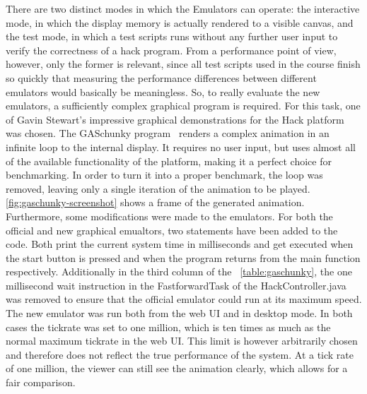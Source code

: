 There are two distinct modes in which the Emulators can operate: the interactive mode, in which the display memory is actually rendered to a visible canvas, and the test mode, in which a test scripts runs without any further user input to verify the correctness of a hack program.
From a performance point of view, however, only the former is relevant, since all test scripts used in the course finish so quickly that measuring the performance differences between different emulators would basically be meaningless.
So, to really evaluate the new emulators, a sufficiently complex graphical program is required. For this task, one of Gavin Stewart's impressive graphical demonstrations for the Hack platform was chosen.
The GASchunky program~\cite{demos} renders a complex animation in an infinite loop to the internal display. It requires no user input, but uses almost all of the available functionality of the platform, making it a perfect choice for benchmarking. In order to turn it into a proper benchmark, the loop was removed, leaving only a single iteration of the animation to be played.
\cref{fig:gaschunky-screenshot} shows a frame of the generated animation.
Furthermore, some modifications were made to the emulators. For both the official and new graphical emualtors, two statements have been added to the code. Both print the current system time in milliseconds and get executed when the start button is pressed and when the program returns from the main function respectively. Additionally in the third column of the ~\cref{table:gaschunky}, the one millisecond wait instruction in the FastforwardTask of the HackController.java was removed to ensure that the official emulator could run at its maximum speed.
The new emulator was run both from the web UI and in desktop mode. In both cases the tickrate was set to one million, which is ten times as much as the normal maximum tickrate in the web UI. This limit is however arbitrarily chosen and therefore does not reflect the true performance of the system. At a tick rate of one million, the viewer can still see the animation clearly, which allows for a fair comparison.


